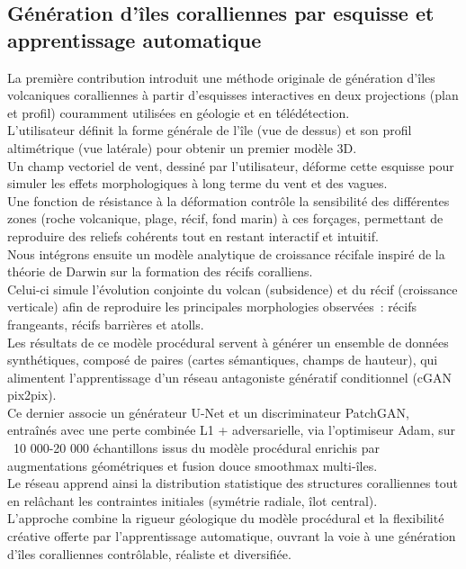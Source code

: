 \subsection*{Génération d'îles coralliennes par esquisse et apprentissage automatique}
La première contribution introduit une méthode originale de génération d'îles volcaniques coralliennes à partir d'esquisses interactives en deux projections (plan et profil) couramment utilisées en géologie et en télédétection. \\
L'utilisateur définit la forme générale de l'île (vue de dessus) et son profil altimétrique (vue latérale) pour obtenir un premier modèle 3D. \\
Un champ vectoriel de vent, dessiné par l'utilisateur, déforme cette esquisse pour simuler les effets morphologiques à long terme du vent et des vagues. \\
Une fonction de résistance à la déformation contrôle la sensibilité des différentes zones (roche volcanique, plage, récif, fond marin) à ces forçages, permettant de reproduire des reliefs cohérents tout en restant interactif et intuitif. \\

Nous intégrons ensuite un modèle analytique de croissance récifale inspiré de la théorie de Darwin sur la formation des récifs coralliens. \\
Celui-ci simule l'évolution conjointe du volcan (subsidence) et du récif (croissance verticale) afin de reproduire les principales morphologies observées~: récifs frangeants, récifs barrières et atolls. \\
Les résultats de ce modèle procédural servent à générer un ensemble de données synthétiques, composé de paires (cartes sémantiques, champs de hauteur), qui alimentent l'apprentissage d'un réseau antagoniste génératif conditionnel (cGAN pix2pix). \\
Ce dernier associe un générateur U-Net et un discriminateur PatchGAN, entraînés avec une perte combinée L1 + adversarielle, via l'optimiseur Adam, sur ~10 000-20 000 échantillons issus du modèle procédural enrichis par augmentations géométriques et fusion douce smoothmax multi-îles. \\
Le réseau apprend ainsi la distribution statistique des structures coralliennes tout en relâchant les contraintes initiales (symétrie radiale, îlot central). \\
L'approche combine la rigueur géologique du modèle procédural et la flexibilité créative offerte par l'apprentissage automatique, ouvrant la voie à une génération d'îles coralliennes contrôlable, réaliste et diversifiée. \\

